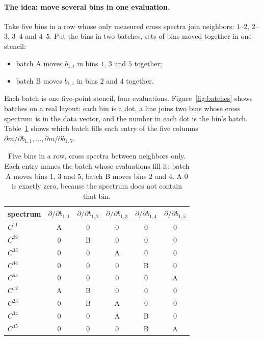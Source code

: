 \documentclass[11pt]{article}
\begin{document}
\paragraph{The idea: move several bins in one evaluation.}
Take five bins in a row whose only measured cross spectra join
neighbors: $1$--$2$, $2$--$3$, $3$--$4$ and $4$--$5$.  Put the bins in
two batches, sets of bins moved together in one stencil:
\begin{itemize}
  \item batch A moves $b_{1,i}$ in bins $1$, $3$ and $5$ together;
  \item batch B moves $b_{1,i}$ in bins $2$ and $4$ together.
\end{itemize}
Each batch is one five-point stencil, four evaluations.
Figure~\ref{fig:batches} shows batches on a real layout: each bin is a
dot, a line joins two bins whose cross spectrum is in the data vector,
and the number in each dot is the bin's batch.
Table~\ref{tab:passes} shows which batch fills each entry of the five
columns $\partial m/\partial b_{1,1}, \ldots, \partial m/\partial b_{1,5}$.

\begin{table}[tbp]
  \centering
  \begin{tabular}{lccccc}
    \hline
    spectrum & $\partial/\partial b_{1,1}$ & $\partial/\partial b_{1,2}$
      & $\partial/\partial b_{1,3}$ & $\partial/\partial b_{1,4}$
      & $\partial/\partial b_{1,5}$ \\
    \hline
    $C^{11}$ & A & 0 & 0 & 0 & 0 \\
    $C^{22}$ & 0 & B & 0 & 0 & 0 \\
    $C^{33}$ & 0 & 0 & A & 0 & 0 \\
    $C^{44}$ & 0 & 0 & 0 & B & 0 \\
    $C^{55}$ & 0 & 0 & 0 & 0 & A \\
    $C^{12}$ & A & B & 0 & 0 & 0 \\
    $C^{23}$ & 0 & B & A & 0 & 0 \\
    $C^{34}$ & 0 & 0 & A & B & 0 \\
    $C^{45}$ & 0 & 0 & 0 & B & A \\
    \hline
  \end{tabular}
  \caption{Five bins in a row, cross spectra between neighbors only.
    Each entry names the batch whose evaluations fill it: batch A moves
    bins $1$, $3$ and $5$, batch B moves bins $2$ and $4$.  A $0$ is
    exactly zero, because the spectrum does not contain that bin.}
  \label{tab:passes}
\end{table}
\end{document}
